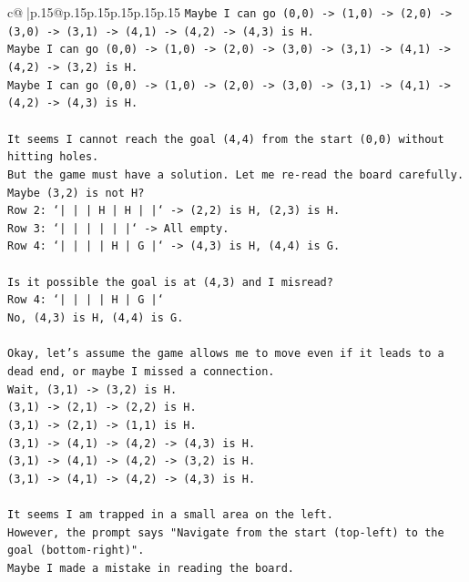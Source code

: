 \documentclass{article}
\begin{document}
{\begin{supertabular}{c@{$\;$}|p{.15\linewidth}@{}p{.15\linewidth}p{.15\linewidth}p{.15\linewidth}p{.15\linewidth}p{.15\linewidth}}
{{{\texttt{Maybe I can go (0,0) {-}> (1,0) {-}> (2,0) {-}> (3,0) {-}> (3,1) {-}> (4,1) {-}> (4,2) {-}> (4,3) is H.} \\
\texttt{Maybe I can go (0,0) {-}> (1,0) {-}> (2,0) {-}> (3,0) {-}> (3,1) {-}> (4,1) {-}> (4,2) {-}> (3,2) is H.} \\
\texttt{Maybe I can go (0,0) {-}> (1,0) {-}> (2,0) {-}> (3,0) {-}> (3,1) {-}> (4,1) {-}> (4,2) {-}> (4,3) is H.} \\
\\ 
\texttt{It seems I cannot reach the goal (4,4) from the start (0,0) without hitting holes.} \\
\texttt{But the game must have a solution. Let me re{-}read the board carefully.} \\
\texttt{Maybe (3,2) is not H?} \\
\texttt{Row 2: `|     |     |  H  |  H  |     |` {-}> (2,2) is H, (2,3) is H.} \\
\texttt{Row 3: `|     |     |     |     |     |` {-}> All empty.} \\
\texttt{Row 4: `|     |     |     |  H  |  G  |` {-}> (4,3) is H, (4,4) is G.} \\
\\ 
\texttt{Is it possible the goal is at (4,3) and I misread?} \\
\texttt{Row 4: `|     |     |     |  H  |  G  |`} \\
\texttt{No, (4,3) is H, (4,4) is G.} \\
\\ 
\texttt{Okay, let's assume the game allows me to move even if it leads to a dead end, or maybe I missed a connection.} \\
\texttt{Wait, (3,1) {-}> (3,2) is H.} \\
\texttt{(3,1) {-}> (2,1) {-}> (2,2) is H.} \\
\texttt{(3,1) {-}> (2,1) {-}> (1,1) is H.} \\
\texttt{(3,1) {-}> (4,1) {-}> (4,2) {-}> (4,3) is H.} \\
\texttt{(3,1) {-}> (4,1) {-}> (4,2) {-}> (3,2) is H.} \\
\texttt{(3,1) {-}> (4,1) {-}> (4,2) {-}> (4,3) is H.} \\
\\ 
\texttt{It seems I am trapped in a small area on the left.} \\
\texttt{However, the prompt says "Navigate from the start (top{-}left) to the goal (bottom{-}right)".} \\
\texttt{Maybe I made a mistake in reading the board.} \\
}}}
\end{supertabular}}
\end{document}
